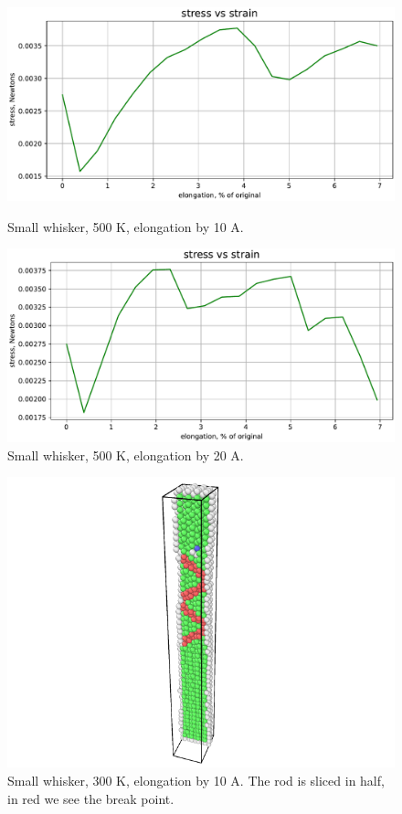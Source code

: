 \documentclass[12pt,a4paper]{article}
\begin{document}
\begin{figure}[h!]
	\centering
	\includegraphics[width=.85\linewidth]{img/milestone09-small-500-10.pdf}
	\caption{Small whisker, 500 K, elongation by 10 A.}
	\includegraphics[width=.85\linewidth]{img/milestone09-small-500-20.pdf}
	\caption{Small whisker, 500 K, elongation by 20 A.}
	\label{fig:whisker-500}
\end{figure}

\begin{figure}[h!]
	\centering
	\includegraphics[width=.85\linewidth]{img/milestone09-small-300-10-pic.png}
	\caption{Small whisker, 300 K, elongation by 10 A. The rod is sliced in half, in red we see the break point.}
	\label{fig:whisker-defect}
\end{figure}
\end{document}
